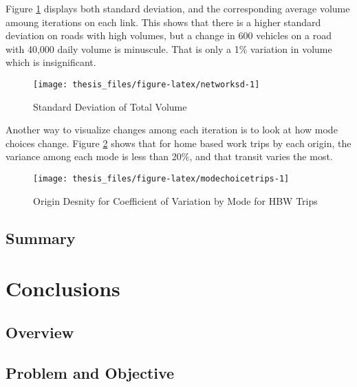 \documentclass[fancy, masters,twoside]{byuthesis}
\begin{document}
Figure \ref{fig:networksd} displays both standard deviation, and the corresponding average volume amoung iterations on each link. This shows that there is a higher standard deviation on roads with high volumes, but a change in 600 vehicles on a road with 40,000 daily volume is minuscule. That is only a 1\% variation in volume which is insignificant.

\begin{figure}

{\centering \texttt{[image: thesis\_files/figure-latex/networksd-1]} 

}

\caption{Standard Deviation of Total Volume}\label{fig:networksd}
\end{figure}

Another way to visualize changes among each iteration is to look at how mode choices change. Figure \ref{fig:modechoicetrips} shows that for home based work trips by each origin, the variance among each mode is less than 20\%, and that transit varies the most.

\begin{figure}

{\centering \texttt{[image: thesis\_files/figure-latex/modechoicetrips-1]} 

}

\caption{Origin Desnity for Coefficient of Variation by Mode for HBW Trips}\label{fig:modechoicetrips}
\end{figure}

\hypertarget{summary-2}{%
\section{Summary}\label{summary-2}}

\hypertarget{conclusions}{%
\chapter{Conclusions}\label{conclusions}}

\hypertarget{overview-3}{%
\section{Overview}\label{overview-3}}

\hypertarget{problem-and-objective}{%
\section{Problem and Objective}\label{problem-and-objective}}
\end{document}
